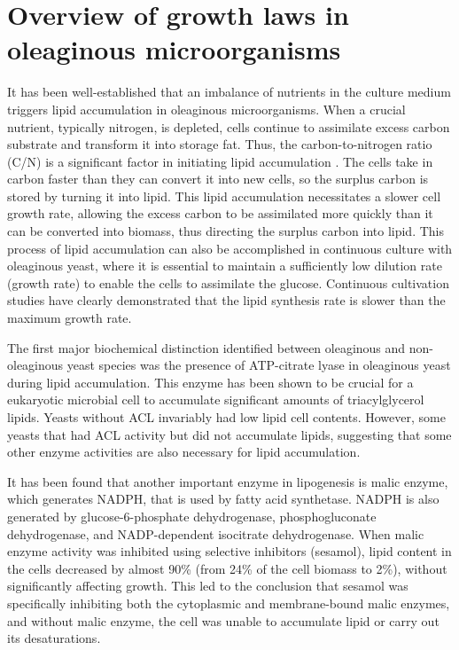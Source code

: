 \section{Overview of growth laws in oleaginous microorganisms}

It has been well-established that an imbalance of nutrients in the culture medium 
triggers lipid accumulation in oleaginous microorganisms. When a crucial nutrient, 
typically nitrogen, is depleted, cells continue to assimilate excess carbon substrate and transform it into storage fat. \cite{Ratledge2002}
Thus, the carbon-to-nitrogen ratio (C/N) is a significant factor in initiating lipid accumulation \cite{Lopes2020}.
The cells take in carbon faster than they can convert it into new cells, so the surplus carbon is stored by turning it into lipid. 
This lipid accumulation necessitates a slower cell growth rate, allowing the excess carbon to be assimilated more quickly 
than it can be converted into biomass, thus directing the surplus carbon into lipid. This process of lipid accumulation 
can also be accomplished in continuous culture with oleaginous yeast, where it is essential to maintain a sufficiently 
low dilution rate (growth rate) to enable the cells to assimilate the glucose. Continuous cultivation 
studies have clearly demonstrated that the lipid synthesis rate is slower than the maximum growth rate. \cite{Ratledge2002}

The first major biochemical distinction identified between oleaginous and non-oleaginous yeast species was the presence 
of ATP-citrate lyase in oleaginous yeast during lipid accumulation. This enzyme has been shown to be crucial 
for a eukaryotic microbial cell to accumulate significant amounts of triacylglycerol lipids. Yeasts without ACL 
invariably had low lipid cell contents. However, some yeasts that had ACL activity but did not accumulate lipids, 
suggesting that some other enzyme activities are also necessary for lipid accumulation. \cite{Ratledge2002}

It has been found that another important enzyme in lipogenesis is malic enzyme, which generates NADPH, that is used by fatty acid synthetase. 
NADPH is also generated by glucose-6-phosphate dehydrogenase, phosphogluconate dehydrogenase, and NADP-dependent 
isocitrate dehydrogenase. When malic enzyme activity was inhibited using selective inhibitors (sesamol), lipid 
content in the cells decreased by almost 90\% (from 24\% of the cell biomass to 2\%), without significantly 
affecting growth. This led to the conclusion that sesamol was specifically inhibiting both the cytoplasmic 
and membrane-bound malic enzymes, and without malic enzyme, the cell was unable to accumulate lipid or carry 
out its desaturations. \cite{Ratledge2002}

